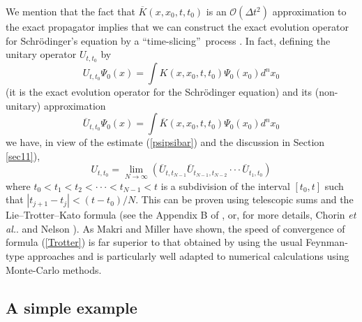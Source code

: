 \documentclass[12pt]{article}%
\begin{document}
We mention that the fact that $\overline{K}(x,x_{0},t,t_{0})$ is an
$\mathcal{O}(\Delta t^{2})$ approximation to the exact propagator implies that
we can construct the exact evolution operator for Schr\"{o}dinger's equation
by a \textquotedblleft time-slicing\textquotedblright\ process \cite{ICP}. In
fact, defining the unitary operator $U_{t,t_{0}}$ by
\[
U_{t,t_{0}}\Psi_{0}(x)=\int K(x,x_{0},t,t_{0})\Psi_{0}(x_{0})d^{n}x_{0}%
\]
(it is the exact evolution operator for the Schr\"{o}dinger equation) and its
(non-unitary) approximation
\[
\overline{U}_{t,t_{0}}\Psi_{0}(x)=\int\overline{K}(x,x_{0},t,t_{0})\Psi
_{0}(x_{0})d^{n}x_{0}%
\]
we have, in view of the estimate (\ref{psipsibar}) and the discussion in
Section \ref{sec11}),
\begin{equation}
U_{t,t_{0}}=\lim_{N\rightarrow\infty}(\overline{U}_{t,t_{N-1}}\overline
{U}_{t_{N-1},t_{N-2}}\cdot\cdot\cdot\overline{U}_{t_{1},t_{0}})
\label{Trotter}%
\end{equation}
where $t_{0}<t_{1}<t_{2}<\cdot\cdot\cdot<t_{N-1}<t$ is a subdivision of the
interval $[t_{0},t]$ such that $|t_{j+1}-t_{j}|<(t-t_{0})/N$. This can be
proven using telescopic sums and the Lie--Trotter--Kato formula (see the
Appendix B of \cite{ICP}, or, for more details, Chorin \textit{et al.}.
\cite{chorinetal} and Nelson \cite{Nelson}). As Makri and Miller
\cite{makmil1,makmil2} have shown, the speed of convergence of formula
(\ref{Trotter}) is far superior to that obtained by using the usual
Feynman-type approaches and is particularly well adapted to numerical
calculations using Monte-Carlo methods.

\subsection{A simple example}
\end{document}
